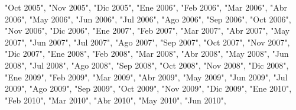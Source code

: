 \documentclass[
]{book}
\newenvironment{Shaded}{\begin{snugshade}}{\end{snugshade}}
\newcommand{\NormalTok}[1]{#1}
\newcommand{\StringTok}[1]{\textcolor[rgb]{0.31,0.60,0.02}{#1}}
\begin{document}
\begin{Shaded}
\begin{Highlighting}[]
                                   \StringTok{"Oct 2005"}\NormalTok{, }\StringTok{"Nov 2005"}\NormalTok{, }\StringTok{"Dic 2005"}\NormalTok{,}
                                   \StringTok{"Ene 2006"}\NormalTok{, }\StringTok{"Feb 2006"}\NormalTok{, }\StringTok{"Mar 2006"}\NormalTok{, }
                                   \StringTok{"Abr 2006"}\NormalTok{, }\StringTok{"May 2006"}\NormalTok{, }\StringTok{"Jun 2006"}\NormalTok{,}
                                   \StringTok{"Jul 2006"}\NormalTok{, }\StringTok{"Ago 2006"}\NormalTok{, }\StringTok{"Sep 2006"}\NormalTok{, }
                                   \StringTok{"Oct 2006"}\NormalTok{, }\StringTok{"Nov 2006"}\NormalTok{, }\StringTok{"Dic 2006"}\NormalTok{,}
                                   \StringTok{"Ene 2007"}\NormalTok{, }\StringTok{"Feb 2007"}\NormalTok{, }\StringTok{"Mar 2007"}\NormalTok{, }
                                   \StringTok{"Abr 2007"}\NormalTok{, }\StringTok{"May 2007"}\NormalTok{, }\StringTok{"Jun 2007"}\NormalTok{,}
                                   \StringTok{"Jul 2007"}\NormalTok{, }\StringTok{"Ago 2007"}\NormalTok{, }\StringTok{"Sep 2007"}\NormalTok{, }
                                   \StringTok{"Oct 2007"}\NormalTok{, }\StringTok{"Nov 2007"}\NormalTok{, }\StringTok{"Dic 2007"}\NormalTok{,}
                                   \StringTok{"Ene 2008"}\NormalTok{, }\StringTok{"Feb 2008"}\NormalTok{, }\StringTok{"Mar 2008"}\NormalTok{, }
                                   \StringTok{"Abr 2008"}\NormalTok{, }\StringTok{"May 2008"}\NormalTok{, }\StringTok{"Jun 2008"}\NormalTok{,}
                                   \StringTok{"Jul 2008"}\NormalTok{, }\StringTok{"Ago 2008"}\NormalTok{, }\StringTok{"Sep 2008"}\NormalTok{, }
                                   \StringTok{"Oct 2008"}\NormalTok{, }\StringTok{"Nov 2008"}\NormalTok{, }\StringTok{"Dic 2008"}\NormalTok{,}
                                   \StringTok{"Ene 2009"}\NormalTok{, }\StringTok{"Feb 2009"}\NormalTok{, }\StringTok{"Mar 2009"}\NormalTok{, }
                                   \StringTok{"Abr 2009"}\NormalTok{, }\StringTok{"May 2009"}\NormalTok{, }\StringTok{"Jun 2009"}\NormalTok{,}
                                   \StringTok{"Jul 2009"}\NormalTok{, }\StringTok{"Ago 2009"}\NormalTok{, }\StringTok{"Sep 2009"}\NormalTok{, }
                                   \StringTok{"Oct 2009"}\NormalTok{, }\StringTok{"Nov 2009"}\NormalTok{, }\StringTok{"Dic 2009"}\NormalTok{,}
                                   \StringTok{"Ene 2010"}\NormalTok{, }\StringTok{"Feb 2010"}\NormalTok{, }\StringTok{"Mar 2010"}\NormalTok{, }
                                   \StringTok{"Abr 2010"}\NormalTok{, }\StringTok{"May 2010"}\NormalTok{, }\StringTok{"Jun 2010"}\NormalTok{,}

\end{Highlighting}
\end{Shaded}
\end{document}
